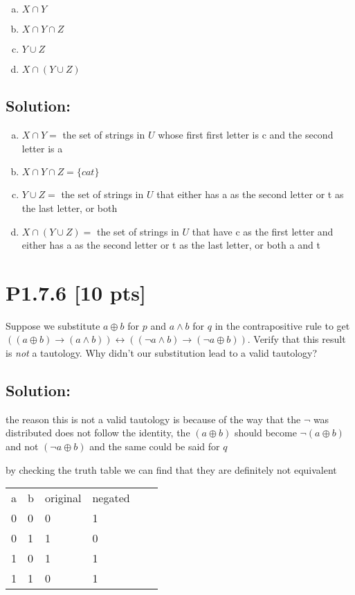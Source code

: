 \documentclass[12pt]{article}
\begin{document}
\begin{enumerate}[(a)]
\item $X \cap Y$
\item $X \cap Y \cap Z$
\item $Y \cup Z$
\item $X \cap (Y \cup Z)$

\end{enumerate}

\subsection*{\textbf{Solution:}}
\begin{enumerate}[(a)]
    \item $X \cap Y =$ the set of strings in $U$ whose first first letter is c and the second letter is a

    \item $X \cap Y\cap Z = \{ cat \}$

    \item $Y \cup Z =$ the set of strings in $U$ that either has a as the second letter or t as the last letter, or both

    \item $X\cap (Y \cup Z) = $ the set of strings in $U$ that have c as the first letter and either has a as the second letter or t as the last letter, or both a and t

\end{enumerate}


\newpage
\section*{\textbf{P1.7.6} [10 pts]}
Suppose we substitute $a \oplus b$ for $p$ and $a \land b$ for $q$ in the contrapositive rule to get $((a \oplus b) \rightarrow (a \land b)) \leftrightarrow ((\neg a \land b) \rightarrow (\neg a \oplus b))$. Verify that this result is \textit{not} a tautology. Why didn’t our substitution lead to a valid tautology?


\subsection*{\textbf{Solution:}}
the reason this is not a valid tautology is because of the way that the $\neg$ was distributed does not follow the identity, the $(a \oplus b)$ should become $\neg (a \oplus b)$ and not $(\neg a \oplus b)$ and the same could be said for $q$

by checking the truth table we can find that they are definitely not equivalent
\begin{table}[htbp] 
    \centering
    \begin{tabular}{llllll}
    \hline
a & b & original & negated \\
0 & 0 & 0        & 1       \\
0 & 1 & 1        & 0       \\
1 & 0 & 1        & 1       \\
1 & 1 & 0        & 1      \\ \hline
    \end{tabular}
\end{table}
\end{document}
